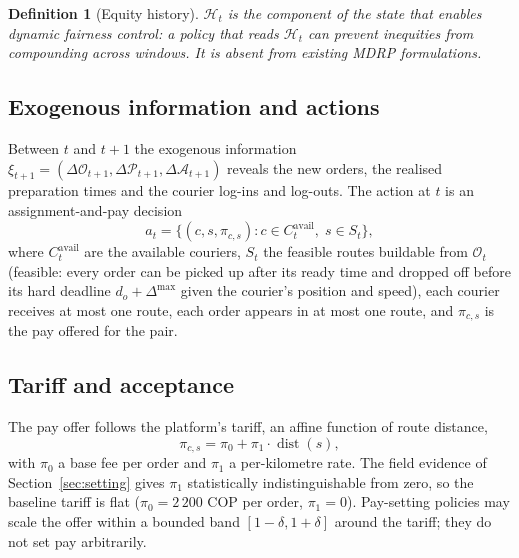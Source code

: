 \documentclass[preprint,12pt,authoryear]{elsarticle}%
\newcommand{\Hist}{\mathcal{H}}
\DeclareMathOperator{\dist}{dist}
\newtheorem{definition}{Definition}
\begin{document}
\begin{definition}[Equity history]
$\Hist_t$ is the component of the state that enables dynamic fairness control: a policy that reads $\Hist_t$ can prevent inequities from compounding across windows. It is absent from existing MDRP formulations.
\end{definition}

\subsection{Exogenous information and actions}

Between $t$ and $t+1$ the exogenous information $\xi_{t+1} = (\Delta\mathcal{O}_{t+1}, \Delta\mathcal{P}_{t+1}, \Delta\mathcal{A}_{t+1})$ reveals the new orders, the realised preparation times and the courier log-ins and log-outs. The action at $t$ is an assignment-and-pay decision
\begin{equation}
a_t = \bigl\{(c, s, \pi_{c,s}) : c \in C_t^{\text{avail}},\; s \in S_t\bigr\},
\label{eq:action}
\end{equation}
where $C_t^{\text{avail}}$ are the available couriers, $S_t$ the feasible routes buildable from $\mathcal{O}_t$ (feasible: every order can be picked up after its ready time and dropped off before its hard deadline $d_o + \Delta^{\max}$ given the courier's position and speed), each courier receives at most one route, each order appears in at most one route, and $\pi_{c,s}$ is the pay offered for the pair.

\subsection{Tariff and acceptance}

The pay offer follows the platform's tariff, an affine function of route distance,
\begin{equation}
\pi_{c,s} = \pi_0 + \pi_1 \cdot \dist(s),
\label{eq:tariff}
\end{equation}
with $\pi_0$ a base fee per order and $\pi_1$ a per-kilometre rate. The field evidence of Section~\ref{sec:setting} gives $\pi_1$ statistically indistinguishable from zero, so the baseline tariff is flat ($\pi_0 = 2\,200$ COP per order, $\pi_1 = 0$). Pay-setting policies may scale the offer within a bounded band $[1-\delta, 1+\delta]$ around the tariff; they do not set pay arbitrarily.
\end{document}
